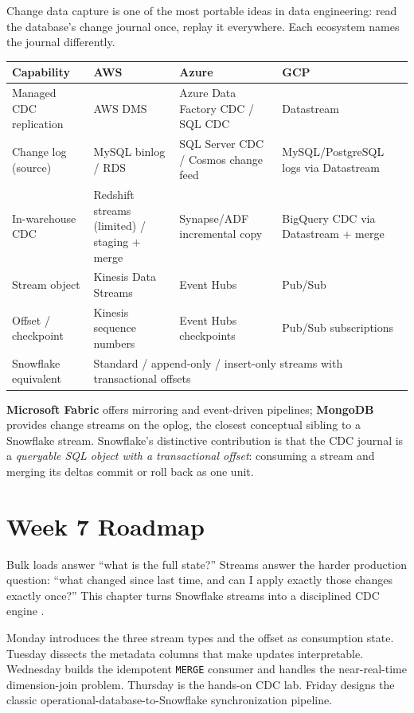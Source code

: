 \begin{crosscloud}
Change data capture is one of the most portable ideas in data engineering: read the database's change journal once, replay it everywhere. Each ecosystem names the journal differently.

\vspace{2mm}
{\footnotesize
\begin{tabular}{@{}p{2.8cm}p{3.0cm}p{3.0cm}p{3.0cm}@{}}
\toprule
\textbf{Capability} & \textbf{AWS} & \textbf{Azure} & \textbf{GCP} \\
\midrule
Managed CDC replication & AWS DMS & Azure Data Factory CDC / SQL CDC & Datastream \\
Change log (source) & MySQL binlog / RDS & SQL Server CDC / Cosmos change feed & MySQL/PostgreSQL logs via Datastream \\
In-warehouse CDC & Redshift streams (limited) / staging + merge & Synapse/ADF incremental copy & BigQuery CDC via Datastream + merge \\
Stream object & Kinesis Data Streams & Event Hubs & Pub/Sub \\
Offset / checkpoint & Kinesis sequence numbers & Event Hubs checkpoints & Pub/Sub subscriptions \\
\addlinespace
Snowflake equivalent & \multicolumn{3}{l}{Standard / append-only / insert-only streams with transactional offsets} \\
\bottomrule
\end{tabular}}

\vspace{1mm}
\textbf{Microsoft Fabric} offers mirroring and event-driven pipelines; \textbf{MongoDB} provides change streams on the oplog, the closest conceptual sibling to a Snowflake stream. Snowflake's distinctive contribution is that the CDC journal is a \emph{queryable SQL object with a transactional offset}: consuming a stream and merging its deltas commit or roll back as one unit.
\end{crosscloud}

\section{Week 7 Roadmap}
Bulk loads answer ``what is the full state?'' Streams answer the harder production question: ``what changed since last time, and can I apply exactly those changes exactly once?'' This chapter turns Snowflake streams into a disciplined CDC engine \cite{snowflakeStreamsDocs}.

Monday introduces the three stream types and the offset as consumption state. Tuesday dissects the metadata columns that make updates interpretable. Wednesday builds the idempotent \texttt{MERGE} consumer and handles the near-real-time dimension-join problem. Thursday is the hands-on CDC lab. Friday designs the classic operational-database-to-Snowflake synchronization pipeline.

